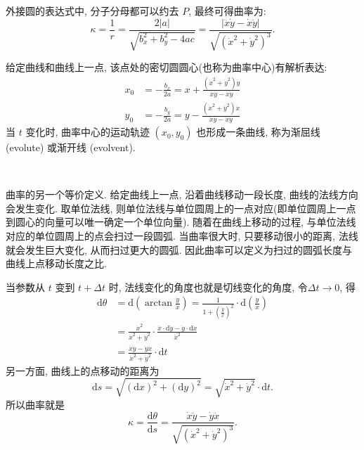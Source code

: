 外接圆的表达式中, 分子分母都可以约去 $P$, 最终可得曲率为:
\[ \kappa = \frac{1}{r} = \frac{2|a|}{\sqrt{b_x^2+b_y^2-4ac}} = \frac{|\ddot{x}\dot{y}-\dot{x}\ddot{y}|}{\sqrt{(\dot{x}^2+\dot{y}^2)^{3}}} .\]

给定曲线和曲线上一点, 该点处的密切圆圆心(也称为曲率中心)有解析表达:
\begin{align*}
x_0 &= -\frac{b_x}{2a} = x + \frac{(\dot{x}^2+\dot{y}^2)\dot{y}}{\ddot{x}\dot{y}-\dot{x}\ddot{y}} \\
y_0 &= -\frac{b_y}{2a} = y - \frac{(\dot{x}^2+\dot{y}^2)\dot{x}}{\ddot{x}\dot{y}-\dot{x}\ddot{y}}
\end{align*}
当 $t$ 变化时, 曲率中心的运动轨迹 $(x_0,y_0)$ 也形成一条曲线, 称为渐屈线 (evolute) 或渐开线 (evolvent). 

~

曲率的另一个等价定义. 给定曲线上一点, 沿着曲线移动一段长度, 曲线的法线方向会发生变化. 取单位法线, 则单位法线与单位圆周上的一点对应(即单位圆周上一点到圆心的向量可以唯一确定一个单位向量). 随着在曲线上移动的过程, 与单位法线对应的单位圆周上的点会扫过一段圆弧. 当曲率很大时, 只要移动很小的距离, 法线就会发生巨大变化, 从而扫过更大的圆弧. 因此曲率可以定义为扫过的圆弧长度与曲线上点移动长度之比.

当参数从 $t$ 变到 $t+\Delta t$ 时, 法线变化的角度也就是切线变化的角度, 令$\Delta t\to 0$, 得
\begin{align*}
\mathrm{d}\theta &= \mathrm{d}\left(\arctan\frac{\dot{y}}{\dot{x}}\right) = \frac{1}{1+(\frac{\dot{y}}{\dot{x}})^2}\cdot\mathrm{d}\left(\frac{\dot{y}}{\dot{x}}\right)\\
&= \frac{\dot{x}^2}{\dot{x}^2+\dot{y}^2}\cdot\frac{\dot{x}\cdot\mathrm{d}\dot{y} - \dot{y}\cdot\mathrm{d}\dot{x}}{\dot{x}^2}\\
&= \frac{\dot{x}\ddot{y}-\dot{y}\ddot{x}}{\dot{x}^2+\dot{y}^2}\cdot\mathrm{d}t
\end{align*}
另一方面, 曲线上的点移动的距离为 
\[ \mathrm{d}s = \sqrt{(\mathrm{d}x)^2 + (\mathrm{d}y)^2} = \sqrt{\dot{x}^2+\dot{y}^2}\cdot\mathrm{d}t .\]
所以曲率就是
\[\kappa = \frac{\mathrm{d}\theta}{\mathrm{d}s} = \frac{\dot{x}\ddot{y}-\dot{y}\ddot{x}}{\sqrt{(\dot{x}^2+\dot{y}^2)^3}} .\]

~

